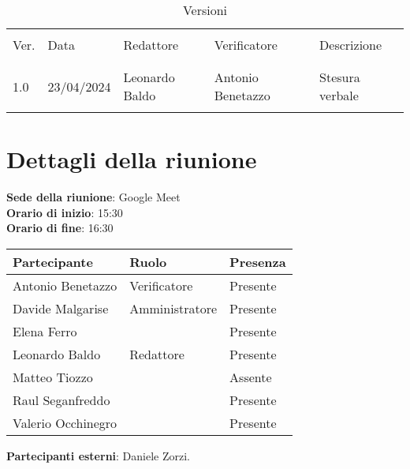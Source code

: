 \documentclass[italian,12pt]{article}
\begin{document}


\newpage



\begin{table}[!h]
	\caption{Versioni}
	\footnotesize
	\begin{center}
		\begin{tabular}{ l l l l l }
			\hline \\[-2ex]
			Ver. & Data       & Redattore          & Verificatore       & Descrizione  \\
			\\[-2ex] \hline \\[-1.5ex]
			1.0  & 23/04/2024 & Leonardo Baldo  & Antonio Benetazzo & Stesura verbale \\
			\\[-1.5ex] \hline
		\end{tabular}
	\end{center}
\end{table}

\newpage

\tableofcontents

\newpage

\section{Dettagli della riunione}


\textbf{Sede della riunione}: Google Meet\\
\textbf{Orario di inizio}: 15:30\\
\textbf{Orario di fine}: 16:30\\


\begin{flushleft}
	\begin{table}[!h]
	\begin{tabular}{ |l|l|l| } 
		\hline
		\textbf{Partecipante} & \textbf{Ruolo}       & \textbf{Presenza} \\
		\hline 
		Antonio Benetazzo     & Verificatore         & Presente          \\
		Davide Malgarise      & Amministratore       & Presente          \\
		Elena Ferro           &                      & Presente          \\
		Leonardo Baldo        & Redattore	         & Presente          \\
		Matteo Tiozzo         &                      & Assente           \\
		Raul Seganfreddo      &                      & Presente          \\
		Valerio Occhinegro    &                      & Presente          \\
		\hline
	\end{tabular}
	\end{table}
	\textbf{Partecipanti esterni}: Daniele Zorzi.
\end{flushleft}
\end{document}
